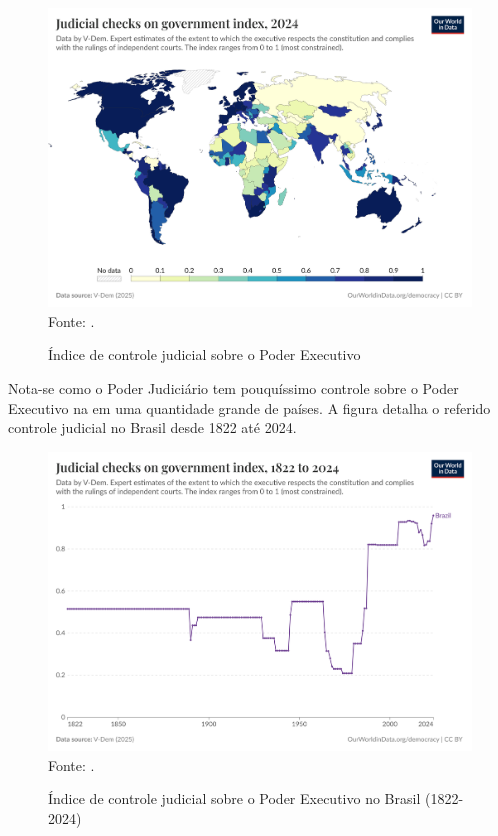 \begin{figure}[H]
	\centering
	\caption{Índice de controle judicial sobre o Poder Executivo}
	\includegraphics[width=1\linewidth]{figuras/judicial-constraints-on-the-executive-index.png}
	\label{fig:judicial-constraints-on-the-executive-index}
	\footnotesize{Fonte: \cite{jus_constraints_on_gov}.}
\end{figure}

Nota-se como o Poder Judiciário tem pouquíssimo controle sobre o Poder Executivo na em uma quantidade grande de países. A figura detalha o referido controle judicial no Brasil desde 1822 até 2024.

\begin{figure}[H]
    \centering
    \caption{Índice de controle judicial sobre o Poder Executivo no Brasil (1822-2024)}
    \includegraphics[width=1\linewidth]{figuras/judicial-constraints-on-the-executive-index-brazil.png}
    \label{fig:judicial-constraints-on-the-executive-index-brazil}
    \footnotesize{Fonte: \cite{jus_constraints_on_gov}.}
\end{figure}

